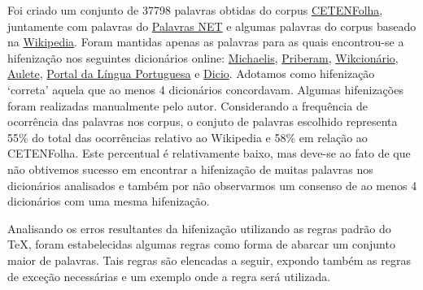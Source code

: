 \documentclass{article}
\begin{document}
Foi criado um conjunto de 37798 palavras obtidas do corpus
\href{https://www.linguateca.pt/cetenfolha/index_info.html}{CETENFolha},
juntamente com palavras do \href{https://www.palavras.net/}{Palavras NET} e
algumas palavras do corpus baseado na
\href{https://pt.wikipedia.org}{Wikipedia}. 
Foram mantidas apenas as palavras
para as quais encontrou-se a hifenização nos seguintes dicionários online:
\href{https://michaelis.uol.com.br/}{Michaelis},
\href{https://dicionario.priberam.org/}{Priberam},
\href{https://pt.wiktionary.org}{Wikcionário},
\href{https://aulete.com.br/}{Aulete},
\href{http://www.portaldalinguaportuguesa.org/}{Portal da Língua Portuguesa} e
\href{https://www.dicio.com.br/}{Dicio}.
Adotamos como hifenização `correta' aquela que ao menos 4 dicionários
concordavam. Algumas hifenizações foram realizadas manualmente pelo autor.
Considerando a frequência de ocorrência das palavras nos corpus, o conjuto de
palavras escolhido representa 55\% do total das ocorrências relativo ao
Wikipedia e 58\% em relação ao CETENFolha.
%
% 
%
%
Este percentual é relativamente baixo, mas deve-se ao fato de que não obtivemos
sucesso em encontrar a hifenização de muitas palavras nos dicionários
analisados e também por não observarmos um consenso de ao menos 4 dicionários
com uma mesma hifenização.

Analisando os erros resultantes da hifenização utilizando as regras padrão do
TeX, foram estabelecidas algumas regras como forma de abarcar um conjunto maior
de palavras. Tais regras são elencadas a seguir, expondo também as regras de
exceção necessárias e um exemplo onde a regra será utilizada.
\end{document}
